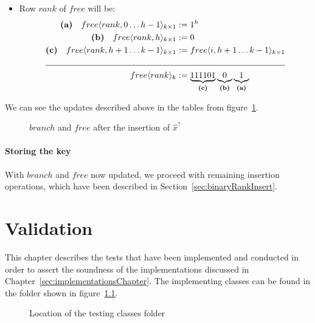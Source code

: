 \begin{enumerate}
\begin{itemize}
        \item
        Row $rank$ of $free$ will be:
        \begin{align*}
            \textbf{(a)}\quad free\langle rank, 0 \dots h - 1 \rangle_{k \times 1} &:= 1^h \\
            \textbf{(b)}\quad free\langle rank, h\rangle_{k \times 1} &:= 0 \\
            \textbf{(c)}\quad free\langle rank, h + 1 \dots k - 1\rangle_{k \times 1} &:= free\langle i, h + 1 \dots k - 1\rangle_{k \times 1} \\
            \cline{1-2}
            free\langle rank \rangle_k &:=\underbrace{111101}_{\textbf{(c)}} \underbrace{0}_{\textbf{(b)}} \underbrace{1}_{\textbf{(a)}}
        \end{align*}
    \end{itemize}

    We can see the updates described above in the tables from figure~\ref{fig:branchAndFreeAfterUpdatingValuesForRank}.
    \begin{figure}[H]
    \centering
    
    \caption[Example of $branch$ and $free$ after the insertion of a $\hat x^?$ ]{$branch$ and $free$ after the insertion of $\hat x^?$}
    \label{fig:branchAndFreeAfterUpdatingValuesForRank}
    \end{figure}
    
\end{enumerate}

\subsubsection{Storing the key} \label{sec:dontCaresInsert}

With $branch$ and $free$ now updated, we proceed with remaining insertion operations, which have been described in Section~\ref{sec:binaryRankInsert}.

\chapter{Validation} \label{sec:validationChapter}

This chapter describes the tests that have been implemented and conducted in order to assert the soundness of the implementations discussed in Chapter~\ref{sec:implementationsChapter}.
The implementing classes can be found in the folder shown in figure~\ref{fig:testFolderTree}.
\begin{figure}[H]
    \caption{Location of the testing classes folder}
    \label{fig:testFolderTree}
\end{figure}


